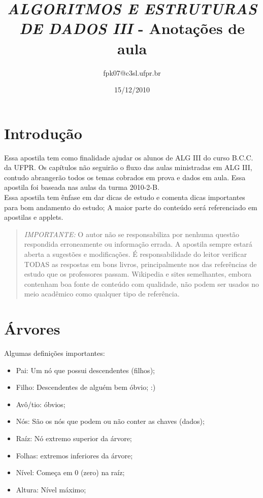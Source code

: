 \documentclass{article}
\title{\textit{ALGORITMOS E ESTRUTURAS DE DADOS III} - Anotações de aula}
\author{fpk07@c3sl.ufpr.br}
\date{15/12/2010}
\begin{document}
\maketitle

\tableofcontents

\section{Introdução}

Essa apostila tem como finalidade ajudar os alunos de ALG III do curso B.C.C. da
UFPR. Os capítulos não seguirão o fluxo das aulas ministradas em ALG III,
contudo abrangerão todos os temas cobrados em prova e dados em aula. Essa
apostila foi baseada nas aulas da turma 2010-2-B.\\
Essa apostila tem ênfase em dar dicas de estudo e comenta dicas importantes para
bom andamento do estudo; A maior parte do conteúdo será referenciado em
apostilas e applets.

\begin{quotation}
\textit{IMPORTANTE:} O autor não se responsabiliza por nenhuma questão respondida
erroneamente ou informação errada. A apostila sempre estará aberta a sugestões e modificações. É
responsabilidade do leitor verificar TODAS as respostas em bons livros,
principalmente nos das referências de estudo que os professores passam.
Wikipedia e sites semelhantes, embora contenham boa fonte de conteúdo com
qualidade, não podem ser usados no meio acadêmico como qualquer tipo de
referência.
\end{quotation}

\section{Árvores}
Algumas definições importantes:

\begin{itemize}
	\item Pai: Um nó que possui descendentes (filhos);
	\item Filho: Descendentes de alguém bem óbvio; :)
	\item Avô/tio: óbvios;
	\item Nós: São os nós que podem ou não conter as chaves (dados);
	\item Raíz: Nó extremo superior da árvore;
	\item Folhas: extremos inferiores da árvore;
	\item Nível: Começa em 0 (zero) na raíz;
	\item Altura: Nível máximo;
\end{itemize}
\end{document}
